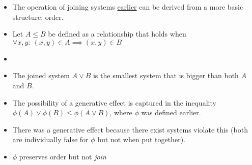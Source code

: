 \begin{itemize}
    \item The operation of joining systems \href{doc/1 math/Seven Sketches in Compositionality/1 Chapter 1: Generative Effects/1 More than the sum of their parts/1 A first look at generative effects}{earlier} can be derived from a more basic structure: order.

    \item Let $A \leq B$ be defined as a relationship that holds when $\forall x,y:\ (x,y) \in A \implies (x,y) \in B$
    \item  {}
    \item  The joined system $A \lor B$ is the smallest system that is bigger than both $A$ and $B$.
    \item The possibility of a generative effect is captured in the inequality $\phi(A) \lor \phi(B) \leq \phi(A \lor B)$, where $\phi$ was defined \href{doc/1 math/Seven Sketches in Compositionality/1 Chapter 1: Generative Effects/1 More than the sum of their parts/1 A first look at generative effects|reference}{earlier}.
    \item There was a generative effect because there exist systems violate this (both are individually false for $\phi$ but not when put together).
    \item $\phi$ preserves order but not \emph{join}
  \end{itemize}
